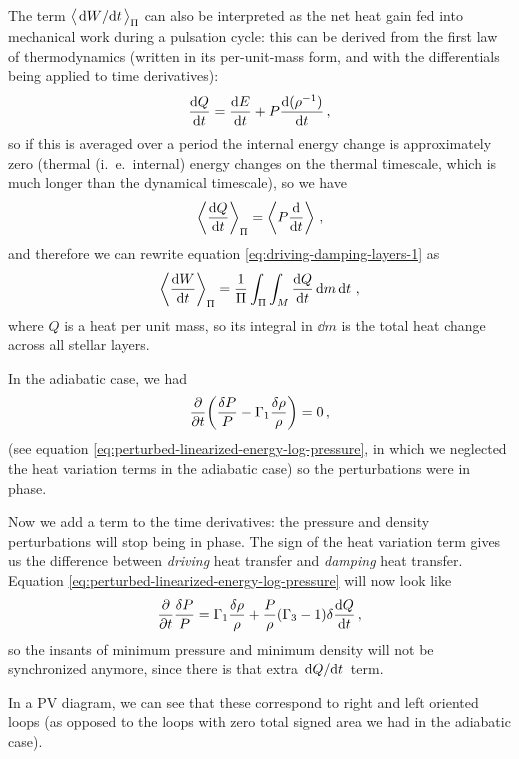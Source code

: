 \documentclass[main.tex]{subfiles}
\begin{document}
The term \(\expval{\dv*{W}{t}}_\Pi \) can also be interpreted as the net heat gain fed into mechanical work during a pulsation cycle: this can be derived from the first law of thermodynamics (written in its per-unit-mass form, and with the differentials being applied to time derivatives): 
%
\begin{align}
\dv{Q}{t} = \dv{E}{t} + P \dv{(\rho^{-1})}{t}
\,,
\end{align}
%
so if this is averaged over a period the internal energy change is approximately zero (thermal (i.\ e.\ internal) energy changes on the thermal timescale, which is much longer than the dynamical timescale), so we have 
%
\begin{align}
\expval{\dv{Q}{t}}_{\Pi } = \expval{P \dv{}{t} (\rho^{-1})}
\,,
\end{align}
%
and therefore we can rewrite equation \eqref{eq:driving-damping-layers-1} as 
%
\begin{align}
\expval{\dv{W}{t}}_{\Pi } = \frac{1}{\Pi } \int_{\Pi } \int_{M} \dv{Q}{t} \dd{m} \dd{t}
\,,
\end{align}
%
where \(Q\) is a heat per unit mass, so its integral in \(\dd{m}\) is the total heat change across all stellar layers.

In the adiabatic case, we had 
%
\begin{align}
\pdv{}{t}\qty( \frac{\delta P}{P} - \Gamma_1 \frac{\delta \rho}{\rho}) =0
\,,
\end{align}
%
(see equation \eqref{eq:perturbed-linearized-energy-log-pressure}, in which we neglected the heat variation terms in the adiabatic case) so the perturbations were in phase.

Now we add a term to the time derivatives: the pressure and density perturbations will stop being in phase. The sign of the heat variation term gives us the difference between \emph{driving} heat transfer and \emph{damping} heat transfer. Equation \eqref{eq:perturbed-linearized-energy-log-pressure} will now look like 
%
\begin{align}
\pdv{}{t} \frac{ \delta P}{P} = \Gamma_1 \frac{ \delta \rho }{\rho } + \frac{P}{\rho } (\Gamma_3 -1) \delta \dv{Q}{t}
\,,
\end{align}
%
so the insants of minimum pressure and minimum density will not be synchronized anymore, since there is that extra \(\dv*{Q}{t}\) term. 

In a PV diagram, we can see that these correspond to right and left oriented loops (as opposed to the loops with zero total signed area we had in the adiabatic case).
\end{document}
